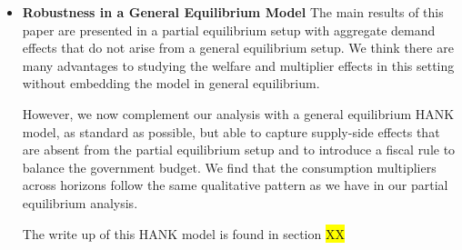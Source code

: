 \begin{itemize}
	\item \textbf{Robustness in a General Equilibrium Model}  The main results of this paper are presented in a partial equilibrium setup with aggregate demand effects that do not arise from a general equilibrium setup. We think there are many advantages to studying the welfare and multiplier effects in this setting without embedding the model in general equilibrium.
	
	However,  we now complement our analysis with a  general equilibrium HANK model, as standard as possible, but able to capture supply-side effects that are absent from the partial equilibrium setup and to introduce a fiscal rule to balance the government budget. We find that the consumption multipliers across horizons follow the same qualitative pattern as we have in our partial equilibrium analysis.
	
	The write up of this HANK model is found in section \colorbox{yellow}{XX}
	
	
\end{itemize}